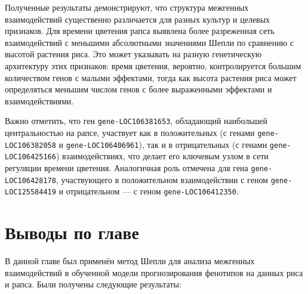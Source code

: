 Полученные результаты демонстрируют, что структура межгенных 
взаимодействий существенно различается для разных культур и целевых 
признаков. Для времени цветения рапса выявлена более разреженная сеть 
взаимодействий с меньшими абсолютными значениями Шепли по сравнению с 
высотой растения риса. Это может указывать на разную генетическую 
архитектуру этих признаков: время цветения, вероятно, контролируется 
большим количеством генов с малыми эффектами, тогда как высота растения 
риса может определяться меньшим числом генов с более выраженными 
эффектами и взаимодействиями.

Важно отметить, что ген \texttt{gene-LOC106381653}, обладающий наибольшей 
центральностью на рапсе, участвует как в положительных (с генами 
\texttt{gene-LOC106382058} и \texttt{gene-LOC106406961}), так и в 
отрицательных (с генами \texttt{gene-LOC106425166}) взаимодействиях, 
что делает его ключевым узлом в сети регуляции времени цветения. 
Аналогичная роль отмечена для гена \texttt{gene-LOC106428178}, 
участвующего в положительном взаимодействии с геном 
\texttt{gene-LOC125584419} и отрицательном — с геном 
\texttt{gene-LOC106412350}.

\section{Выводы по главе}

В данной главе был применён метод Шепли для анализа межгенных 
взаимодействий в обученной модели прогнозирования фенотипов на 
данных риса и рапса. Были получены следующие результаты:

